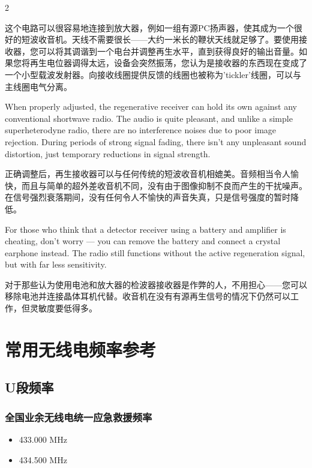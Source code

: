 \documentclass{ctexbook}
\begin{document}
\begin{paracol}{2}
\switchcolumn

这个电路可以很容易地连接到放大器，例如一组有源PC扬声器，使其成为一个很好的短波收音机。天线不需要很长——大约一米长的鞭状天线就足够了。要使用接收器，您可以将其调谐到一个电台并调整再生水平，直到获得良好的输出音量。如果您将再生电位器调得太远，设备会突然振荡，您认为是接收器的东西现在变成了一个小型载波发射器。向接收线圈提供反馈的线圈也被称为'tickler'线圈，可以与主线圈电气分离。

\switchcolumn*

When properly adjusted, the regenerative receiver can hold its own against any conventional shortwave radio. The audio is quite pleasant, and unlike a simple superheterodyne 
radio, there are no interference noises due to poor image rejection. During periods of 
strong signal fading, there isn't any unpleasant sound distortion, just temporary reductions 
in signal strength. 

\switchcolumn

正确调整后，再生接收器可以与任何传统的短波收音机相媲美。音频相当令人愉快，而且与简单的超外差收音机不同，没有由于图像抑制不良而产生的干扰噪声。在信号强烈衰落期间，没有任何令人不愉快的声音失真，只是信号强度的暂时降低。

\switchcolumn*

For those who think that a detector receiver using a battery and amplifier is cheating, don't 
worry — you can remove the battery and connect a crystal earphone instead. The radio still 
functions without the active regeneration signal, but with far less sensitivity.

\switchcolumn

对于那些认为使用电池和放大器的检波器接收器是作弊的人，不用担心——您可以移除电池并连接晶体耳机代替。收音机在没有有源再生信号的情况下仍然可以工作，但灵敏度要低得多。

\end{paracol}

\chapter{常用无线电频率参考}

\section{U段频率}

\subsection{全国业余无线电统一应急救援频率}
\begin{itemize}
    \item 433.000 MHz
    \item 434.500 MHz
\end{itemize}
\end{document}
